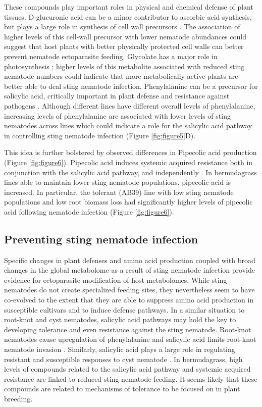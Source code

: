 \documentclass[fleqn,10pt]{wlscirep}
\begin{document}
These compounds play important roles in physical and chemical defense of plant tissues.  D-glucuronic acid can be a minor contributor to ascorbic acid synthesis, but plays a large role in synthesis of cell wall precursors \cite{valpuesta2004biosynthesis}.  The association of higher levels of this cell-wall precursor with lower nematode abundances could suggest that host plants with better physically protected cell walls can better prevent nematode ectoparasite feeding. Glycolate has a major role in photosynthesis \cite{tolbert1997c2}; higher levels of this metabolite associated with reduced sting nematode numbers could indicate that more metabolically active plants are better able to deal sting nematode infection.  Phenylalanine can be a precursor for salicylic acid, critically important in plant defense and resistance against pathogens \cite{raskin1992role,delaney1994central,mauch1996production}. Although different lines have different overall levels of phenylalanine, increasing levels of phenylalanine are associated with lower levels of sting nematodes across lines which could indicate a role for the salicylic acid pathway in controlling sting nematode infection (Figure \ref{fig:figure5}D).  

This idea is further bolstered by observed differences in Pipecolic acid production (Figure \ref{fig:figure6}).  Pipecolic acid induces systemic acquired resistance both in conjunction with the salicylic acid pathway, and independently \cite{shan2018pipped,wang2018pipecolic}. In bermudagrass lines able to maintain lower sting nematode populations, pipecolic acid is increased.  In particular, the tolerant (AB39) line with low sting nematode populations and low root biomass loss had significantly higher levels of pipecolic acid following nematode infection (Figure \ref{fig:figure6}).    

\subsection*{Preventing sting nematode infection}
Specific changes in plant defenses and amino acid production coupled with broad changes in the global metabolome as a result of sting nematode infection provide evidence for ectoparasite modification of host metabolomes.  While sting nematodes do not create specialized feeding sites, they nevertheless seem to have co-evolved to the extent that they are able to suppress amino acid production in susceptible cultivars and to induce defense pathways.  In a similar situation to root-knot and cyst nematodes, salicylic acid pathways may hold the key to developing tolerance and even resistance against the sting nematode.  Root-knot nematodes cause upregulation of phenylalanine and salicylic acid limits root-knot nematode invasion \cite{eloh2016untargeted}.  Similarly, salicylic acid plays a large role in regulating resistant and susceptible responses to cyst nematode \cite{uehara2010resistant, martinez2017shifting}.  In bermudagrass, high levels of compounds related to the salicylic acid pathway and systemic acquired resistance are linked to reduced sting nematode feeding.  It seems likely that these compounds are related to mechanisms of tolerance to be focused on in plant breeding. 
\end{document}
